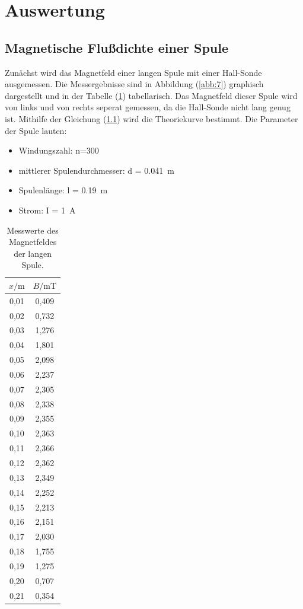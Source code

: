 \section{Auswertung}
\subsection{Magnetische Flußdichte einer Spule}

Zunächst wird das Magnetfeld einer langen Spule mit einer Hall-Sonde ausgemessen.
Die Messergebnisse sind in Abbildung (\ref{abb:7}) graphisch dargestellt und in der
Tabelle (\ref{tab:1}) tabellarisch. Das Magnetfeld dieser Spule wird von links und
von rechts seperat gemessen, da die Hall-Sonde nicht lang genug ist. Mithilfe
der Gleichung (\ref{}) wird die Theoriekurve bestimmt. Die Parameter der Spule lauten:

\begin{itemize}
  \item Windungszahl: n=300
  \item mittlerer Spulendurchmesser: d = \SI{0.041}{\meter}
  \item Spulenlänge: l = \SI{0.19}{\meter}
  \item Strom: I = \SI{1}{\ampere}
\end{itemize}

\begin{table}[H]
  \centering
  \caption{Messwerte des Magnetfeldes der langen Spule.}
  \label{tab:1}
  \begin{tabular}{c c}
    \toprule
    $x/\si{\meter}$ & $B/\si{\milli\tesla}$ \\
    \midrule
    0,01 & 0,409 \\
    0,02 & 0,732 \\
    0,03 & 1,276 \\
    0,04 & 1,801 \\
    0,05 & 2,098 \\
    0,06 & 2,237 \\
    0,07 & 2,305 \\
    0,08 & 2,338 \\
    0,09 & 2,355 \\
    0,10 & 2,363 \\
    0,11 & 2,366 \\
    0,12 & 2,362 \\
    0,13 & 2,349 \\
    0,14 & 2,252 \\
    0,15 & 2,213 \\
    0,16 & 2,151 \\
    0,17 & 2,030 \\
    0,18 & 1,755 \\
    0,19 & 1,275 \\
    0,20 & 0,707 \\
    0,21 & 0,354 \\
    \bottomrule
  \end{tabular}
\end{table}

